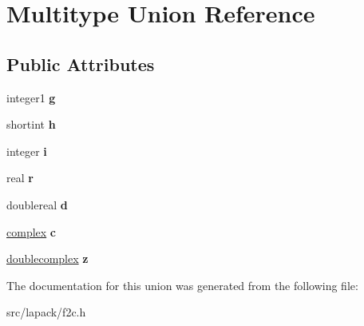 \hypertarget{unionMultitype}{\section{\-Multitype \-Union \-Reference}
\label{unionMultitype}
}
\subsection*{\-Public \-Attributes}
\begin{DoxyCompactItemize}
\item 
\hypertarget{unionMultitype_a6144d7589398ee0202ee7f4fbfad4f21}{integer1 {\bfseries g}}\label{unionMultitype_a6144d7589398ee0202ee7f4fbfad4f21}

\item 
\hypertarget{unionMultitype_a556d63188675caed2d40a14cbfe740e8}{shortint {\bfseries h}}\label{unionMultitype_a556d63188675caed2d40a14cbfe740e8}

\item 
\hypertarget{unionMultitype_a8b913dac6031042a8f5192ee033bb5f1}{integer {\bfseries i}}\label{unionMultitype_a8b913dac6031042a8f5192ee033bb5f1}

\item 
\hypertarget{unionMultitype_ab4eba1c6e83e32ee5b08b7550b46907c}{real {\bfseries r}}\label{unionMultitype_ab4eba1c6e83e32ee5b08b7550b46907c}

\item 
\hypertarget{unionMultitype_ad14eee30c207909f64d8adc2110dc8a1}{doublereal {\bfseries d}}\label{unionMultitype_ad14eee30c207909f64d8adc2110dc8a1}

\item 
\hypertarget{unionMultitype_a30e3bb4e990a88a087fad898df096868}{\hyperlink{structcomplex}{complex} {\bfseries c}}\label{unionMultitype_a30e3bb4e990a88a087fad898df096868}

\item 
\hypertarget{unionMultitype_aa031f83e1db7e8f751458cebe7b9d897}{\hyperlink{structdoublecomplex}{doublecomplex} {\bfseries z}}\label{unionMultitype_aa031f83e1db7e8f751458cebe7b9d897}

\end{DoxyCompactItemize}


\-The documentation for this union was generated from the following file\-:\begin{DoxyCompactItemize}
\item 
src/lapack/f2c.\-h\end{DoxyCompactItemize}
